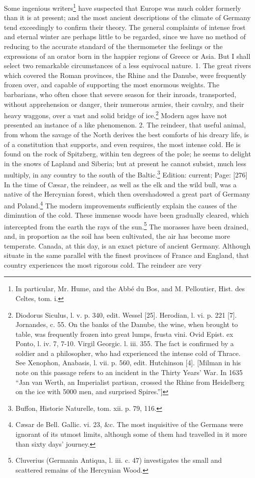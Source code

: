 Some ingenious writers\footnote{In particular, Mr. Hume, and the Abbé du Bos, and M. Pelloutier, Hist. des Celtes, tom. i.} have suspected that Europe was much colder formerly than it is at present; and the most ancient descriptions of the climate of Germany tend exceedingly to confirm their theory. The general complaints of intense frost and eternal winter are perhaps little to be regarded, since we have no method of reducing to the accurate standard of the thermometer the feelings or the expressions of an orator born in the happier regions of Greece or Asia. But I shall select two remarkable circumstances of a less equivocal nature. 1. The great rivers which covered the Roman provinces, the Rhine and the Danube, were frequently frozen over, and capable of supporting the most enormous weights. The barbarians, who often chose that severe season for their inroads, transported, without apprehension or danger, their numerous armies, their cavalry, and their heavy waggons, over a vast and solid bridge of ice.\footnote{Diodorus Siculus, l. v. p. 340, edit. Wessel [25]. Herodian, l. vi. p. 221 [7]. Jornandes, c. 55. On the banks of the Danube, the wine, when brought to table, was frequently frozen into great lumps, frusta vini. Ovid Epist. ex Ponto, l. iv. 7, 7-10. Virgil Georgic. l. iii. 355. The fact is confirmed by a soldier and a philosopher, who had experienced the intense cold of Thrace. See Xenophon, Anabasis, l. vii. p. 560, edit. Hutchinson [4]. [Milman in his note on this passage refers to an incident in the Thirty Years\texthebrew{}’ War. In 1635 \texthebrew{“}Jan van Werth, an Imperialist partisan, crossed the Rhine from Heidelberg on the ice with 5000 men, and surprised Spires.\texthebrew{}”]} Modern ages have not presented an instance of a like phenomenon. 2. The reindeer, that useful animal, from whom the savage of the North derives the best comforts of his dreary life, is of a constitution that supports, and even requires, the most intense cold. He is found on the rock of Spitzberg, within ten degrees of the pole; he seems to delight in the snows of Lapland and Siberia; but at present he cannot subsist, much less multiply, in any country to the south of the Baltic.\footnote{Buffon, Historie Naturelle, tom. xii. p. 79, 116.} Edition: current; Page: [276] In the time of Cæsar, the reindeer, as well as the elk and the wild bull, was a native of the Hercynian forest, which then overshadowed a great part of Germany and Poland.\footnote{Cæsar de Bell. Gallic. vi. 23, \&c. The most inquisitive of the Germans were ignorant of its utmost limits, although some of them had travelled in it more than sixty days\texthebrew{}’ journey.} The modern improvements sufficiently explain the causes of the diminution of the cold. These immense woods have been gradually cleared, which intercepted from the earth the rays of the sun.\footnote{Cluverius (Germania Antiqua, l. iii. c. 47) investigates the small and scattered remains of the Hercynian Wood.} The morasses have been drained, and, in proportion as the soil has been cultivated, the air has become more temperate. Canada, at this day, is an exact picture of ancient Germany. Although situate in the same parallel with the finest provinces of France and England, that country experiences the most rigorous cold. The reindeer are very 